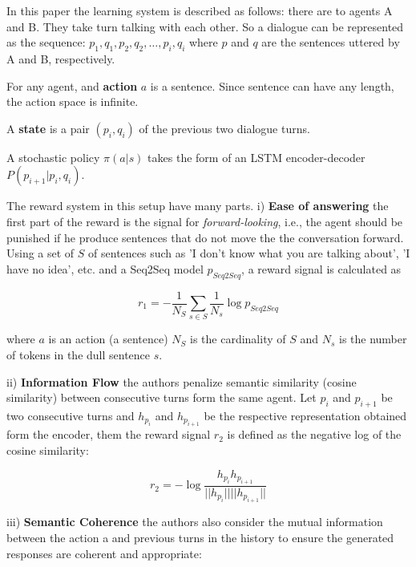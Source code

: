 \par In this paper the learning system is described as follows: there are to agents A and B. They take turn talking with each other. So a dialogue can be represented as the sequence: $p_1, q_1, p_2, q_2, \dots, p_i, q_i$ where $p$ and $q$ are the sentences uttered by A and B, respectively.

\par For any agent, and \textbf{action} $a$ is a sentence. Since sentence can have any length, the action space is infinite.

\par A \textbf{state} is a pair $(p_i, q_i)$ of the previous two dialogue turns.

\par A stochastic policy $\pi(a|s)$ takes the form of an LSTM encoder-decoder $P(p_{i+1}|p_i, q_i)$.

\par The reward system in this setup have many parts. i) \textbf{Ease of answering}  the first part of the reward is the signal for \textit{forward-looking}, i.e., the agent should be punished if he produce sentences that do not move the the conversation forward. Using a set of $S$ of sentences such as 'I don't know what you are talking about', 'I have no idea', etc. and a Seq2Seq model $p_{Seq2Seq}$, a reward signal is calculated as

\begin{equation}
r_1 = - \frac{1}{N_{S}} \sum_{s\in S} \frac{1}{N_{s}} \log p_{Seq2Seq}
\end{equation}

where $a$ is an action (a sentence) $N_{S}$ is the cardinality of $S$ and $N_{s}$ is the number of tokens in the dull sentence $s$.

ii) \textbf{Information Flow} the authors penalize semantic similarity (cosine similarity) between consecutive turns form the same agent. Let $p_i$ and $p_{i+1}$ be two consecutive turns and $h_{p_{i}}$ and $h_{p_{i+1}}$ be the respective representation obtained form the encoder, them the reward signal $r_2$ is defined as the negative log of the cosine similarity:

\begin{equation}
r_2 = - \log \frac{h_{p_{i}} h_{p_{i+1}}}{||h_{p_{i}}|| ||h_{p_{i+1}}||}
\end{equation}


iii) \textbf{Semantic Coherence} the authors also consider the mutual information between the action a and previous turns in the history to ensure the generated
responses are coherent and appropriate:

